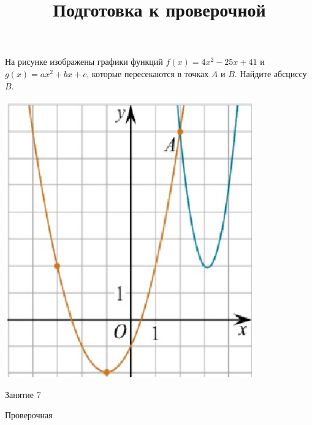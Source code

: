 	\begin{homework}[number=3]
		\begin{listofex}
			\item
			\begin{minipage}[t]{\bodywidth}
				На рисунке изображены графики функций \( f(x)=4x^2-25x+41 \) и \( g(x)=ax^2+bx+c \), которые пересекаются в точках \(A\) и \(B\). Найдите абсциссу  \( B \).
			\end{minipage}
			\hspace{0.02\linewidth}
			\begin{minipage}[t]{\bodywidth}
				\includegraphics[align=b, width=0.8\textwidth]{../../pics/G111M3PP-1}
			\end{minipage}
		\end{listofex}
	\end{homework}
	
	\begin{class}[number=7]
		\title{Подготовка к проверочной}
		\begin{listofex}
			\item Занятие 7
		\end{listofex}
	\end{class}
	
	\begin{exam}
		\begin{listofex}
			\item Проверочная
		\end{listofex}
	\end{exam}
